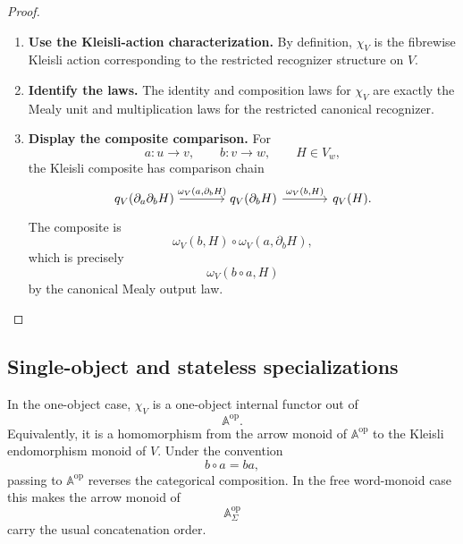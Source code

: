 \begin{proof}
    \leavevmode
    \begin{enumerate}
        \item \textbf{Use the Kleisli-action characterization.}
        By definition, \(\chi_V\) is the fibrewise Kleisli action corresponding
        to the restricted recognizer structure on \(V\).

        \item \textbf{Identify the laws.}
        The identity and composition laws for \(\chi_V\) are exactly the Mealy
        unit and multiplication laws for the restricted canonical recognizer.

        \item \textbf{Display the composite comparison.}
        For
        \[
            a:u\to v,
            \qquad
            b:v\to w,
            \qquad
            H\in V_w,
        \]
        the Kleisli composite has comparison chain
        \[
        \begin{tikzcd}[column sep=large, row sep=large]
            q_V(\partial_a\partial_bH)
                \arrow[r, "{\omega_V(a,\partial_bH)}"]
            &
            q_V(\partial_bH)
                \arrow[r, "{\omega_V(b,H)}"]
            &
            q_V(H).
        \end{tikzcd}
        \]
        The composite is
        \[
            \omega_V(b,H)\circ\omega_V(a,\partial_bH),
        \]
        which is precisely
        \[
            \omega_V(b\circ a,H)
        \]
        by the canonical Mealy output law.
    \end{enumerate}
\end{proof}

\subsection{Single-object and stateless specializations}
\label{subsec:action-single-object-stateless}

In the one-object case, \(\chi_V\) is a one-object internal functor out of
\[
    \mathbb A^{\mathrm{op}}.
\]
Equivalently, it is a homomorphism from the arrow monoid of
\(\mathbb A^{\mathrm{op}}\) to the Kleisli endomorphism monoid of \(V\). Under
the convention
\[
    b\circ a=ba,
\]
passing to \(\mathbb A^{\mathrm{op}}\) reverses the categorical composition. In
the free word-monoid case this makes the arrow monoid of
\[
    \mathbb A_\Sigma^{\mathrm{op}}
\]
carry the usual concatenation order.

